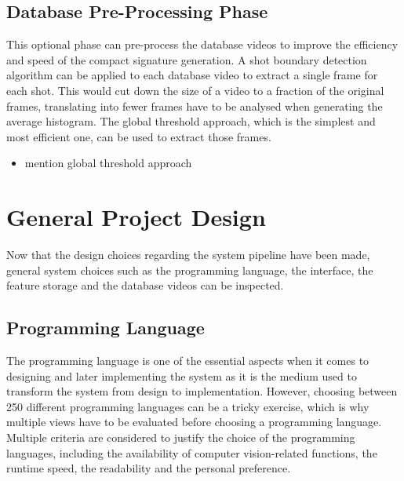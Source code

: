 \subsection{Database Pre-Processing Phase}

This optional phase can pre-process the database videos to improve the efficiency and speed of the compact signature generation. A shot boundary detection algorithm can be applied to each database video to extract a single frame for each shot. This would cut down the size of a video to a fraction of the original frames, translating into fewer frames have to be analysed when generating the average histogram. The global threshold approach, which is the simplest and most efficient one, can be used to extract those frames. 

\begin{itemize}
    \item mention global threshold approach
\end{itemize}

\section{General Project Design}

Now that the design choices regarding the system pipeline have been made, general system choices such as the programming language, the interface, the feature storage and the database videos can be inspected.

\subsection{Programming Language}

The programming language is one of the essential aspects when it comes to designing and later implementing the system as it is the medium used to transform the system from design to implementation. However, choosing between 250 different programming languages \cite{tiobe} can be a tricky exercise, which is why multiple views have to be evaluated before choosing a programming language. Multiple criteria are considered to justify the choice of the programming languages, including the availability of computer vision-related functions, the runtime speed, the readability and the personal preference.\\

